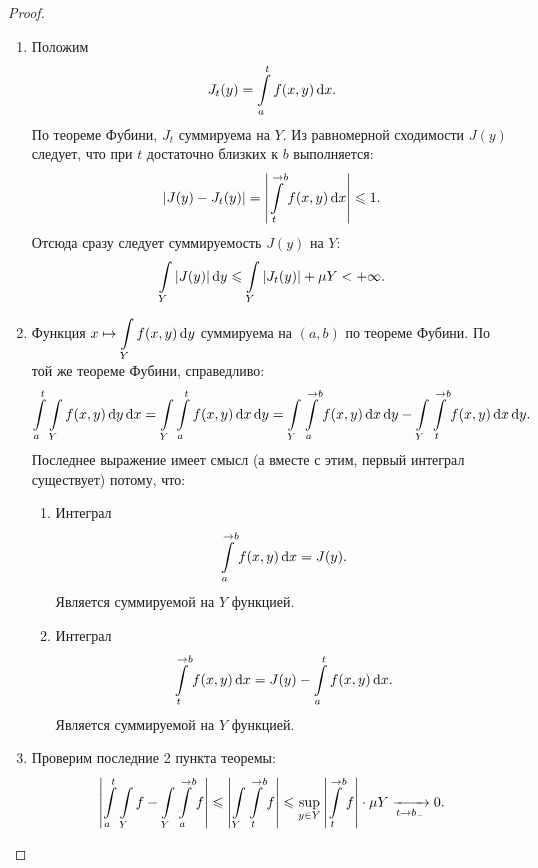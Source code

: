 \begin{proof}
    \enewline
    \begin{enumerate}
        \item Положим 
            \[ 
                J_t(y) = \intl_a^t{f(x, y) \dd x}
            .\]
            По теореме Фубини, $J_t$ суммируема на $Y$. Из равномерной сходимости $J(y)$ следует,
            что при $t$ достаточно близких к $b$ выполняется:
            \[
                \abs*{J(y) - J_t(y)} = \abs*{\intl_t^{\to b}{f(x, y) \dd x}} \leqslant 1
            .\]
            Отсюда сразу следует суммируемость $J(y)$ на $Y$:
            \[
                \intl_Y{|J(y)| \dd y} \leqslant \intl_Y{|J_t(y)|} + \mu{Y} < +\infty
            .\]
        \item Функция $\displaystyle x \mapsto \intl_Y{f(x, y) \dd y}$ суммируема на $(a, b)$ по
            теореме Фубини. По той же теореме Фубини, справедливо:
            \[
                \intl_a^t{\intl_Y{f(x, y) \dd y} \dd x} = \intl_Y{\intl_a^t{f(x, y) \dd x} \dd y} 
                = \intl_Y{\intl_a^{\to b}{f(x, y) \dd x} \dd y} 
                - \intl_Y{\intl_t^{\to b}{f(x, y) \dd x} \dd y}
            .\]
            Последнее выражение имеет смысл (а вместе с этим, первый интеграл существует) потому, что:
            \begin{enumerate}
                \item Интеграл
                    \[
                        \intl_a^{\to b}{f(x, y) \dd x} = J(y)
                    .\]
                    Является суммируемой на $Y$ функцией.
                \item Интеграл
                    \[
                        \intl_t^{\to b}{f(x, y) \dd x} = J(y) - \intl_a^t{f(x, y) \dd x}
                    .\]
                    Является суммируемой на $Y$ функцией.
            \end{enumerate}
        \item Проверим последние 2 пункта теоремы:
            \[
                \abs*{\intl_a^t{\intl_Y{f}} - \intl_Y{\intl_a^{\to b}{f}}} \leqslant
                \abs*{\intl_Y{\intl_t^{\to b}{f}}} \leqslant 
                \sup_{y \in Y}{\abs*{\intl_t^{\to b}{f}}} \cdot \mu{Y} \xrightarrow[t \to b_-]{} 0
            .\]
    \end{enumerate}
\end{proof}

